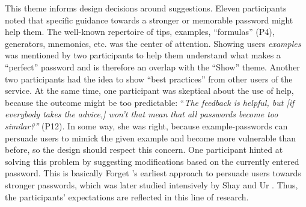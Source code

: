 This theme informs design decisions around suggestions. Eleven participants noted that specific guidance towards a stronger or memorable password might help them. The well-known repertoire of tips, examples, ``formulas'' (P4), generators, mnemonics, etc. was the center of attention. Showing users \textit{examples} was mentioned by two participants to help them understand what makes a ``perfect'' password and is therefore an overlap with the ``Show'' theme. Another two participants had the idea to show ``best practices'' from other users of the service. At the same time, one participant was skeptical about the use of help, because the outcome might be too predictable: ``\textit{The feedback is helpful, but [if everybody takes the advice,] won't that mean that all passwords become too similar?''} (P12). In some way, she was right, because example-passwords can persuade users to mimick the given example and become more vulnerable than before, so the design should respect this concern. One participant hinted at solving this problem by suggesting modifications based on the currently entered password. This is basically Forget \etal's earliest approach to persuade users towards stronger passwords, which was later studied intensively by Shay \etal \cite{Shay2015SpoonfulOfSugar} and Ur \etal \cite{Ur2017DataDrivenPWMeter}. Thus, the participants' expectations are reflected in this line of research.




